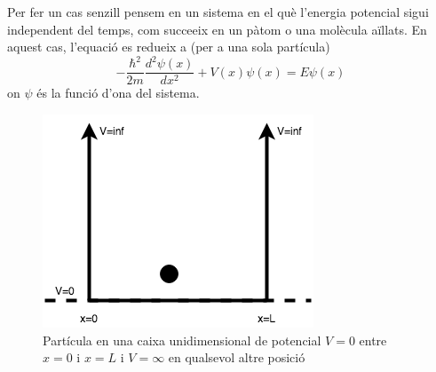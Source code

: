 Per fer un cas senzill pensem en un sistema en el què l'energia potencial sigui independent del temps, com succeeix en un pàtom o una molècula aïllats. En aquest cas, l'equació es redueix a (per a una sola partícula)
\[
-\frac{\hbar^2}{2m}\frac{d^2 \psi(x)}{dx^2}+V(x)\psi(x)=E\psi(x)
\label{Eq:Schr1x}
\]
on $\psi$ és la funció d'ona del sistema.
\begin{figure}[h]
\centering
\includegraphics[scale=0.6]{figures/ParticulaCaixa.png}
\caption{Partícula en una caixa unidimensional de potencial $V=0$ entre $x=0$ i $x=L$ i $V=\infty$ en qualsevol altre posició}
\label{fig:ParticulaCaixa}
\end{figure}
